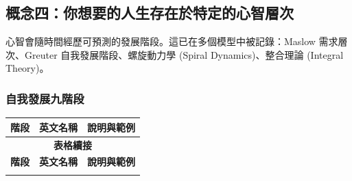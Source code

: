 \documentclass[12pt,a4paper]{article}
\begin{document}
\subsection{概念四：你想要的人生存在於特定的心智層次}

心智會隨時間經歷可預測的發展階段。這已在多個模型中被記錄：Maslow 需求層次、Greuter 自我發展階段、螺旋動力學 (Spiral Dynamics)、整合理論 (Integral Theory)。

\subsubsection{自我發展九階段}

\begin{longtable}{clp{9cm}}
\toprule
\textbf{階段} & \textbf{英文名稱} & \textbf{說明與範例} \\
\midrule
\endfirsthead

\multicolumn{3}{c}{\textbf{表格續接}} \\
\toprule
\textbf{階段} & \textbf{英文名稱} & \textbf{說明與範例} \\
\midrule
\endhead

\bottomrule
\endfoot


\end{longtable}
\end{document}
